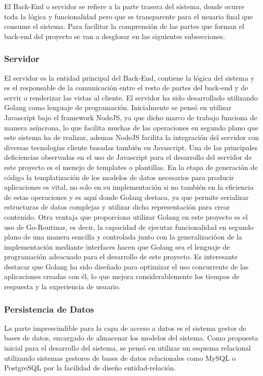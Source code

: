 \documentclass[a4paper,11pt]{book}
\begin{document}
El Back-End o servidor se refiere a la parte trasera del sistema, donde ocurre toda la lógica y funcionalidad pero que es transparente para el usuario final que consume el sistema. Para facilitar la comprensión de las partes que forman  el back-end del proyecto se van a desglosar en las siguientes subsecciones.

\subsubsection{Servidor}

El servidor es la entidad principal del Back-End, contiene la lógica del sistema y es el responsable de la comunicación entre el resto de partes del back-end y de servir o renderizar las vistas al cliente.
El servidor ha sido desarrollado utilizando Golang\cite{go} como lenguaje de programación. Inicialmente se pensó en utilizar Javascript bajo el framework NodeJS, ya que dicho marco de trabajo funciona de manera asíncrona, lo que facilita muchas de las operaciones en segundo plano que este sistema ha de realizar, ademas NodeJS facilita la integración del servidor con diversas tecnologías cliente basadas también en Javascript. Una de las principales deficiencias  observadas en el uso de Javascript para el desarrollo del servidor de este proyecto es el menejo de templates o plantillas. 
En la etapa de generación de código la templatización de los modelos de datos necesarios para producir aplicaciones es vital, no solo en su implementación si no también en la eficiencia de estas operaciones y es aquí donde Golang destaca, ya que permite serializar estructuras de datos complejas y utilizar dicha representación para crear contenido. Otra ventaja que proporciona utilizar Golang en este proyecto es el uso de Go-Routinas, es decir, la capacidad de ejecutar funcionalidad en segundo plano de una manera sencilla y controlada junto con la generalizacióon de la implementación mediante interfaces hacen que Golang sea el lenguaje de programación adeacuado para el desarrollo de este proyecto.  Es interesante destacar que Golang ha sido diseñado para optimizar el uso concurrente de las aplicaciones creadas con él, lo que mejora considerablemente los tiempos de respuesta y la experiencia de usuario. 

\subsubsection{Persistencia de Datos}

La parte imprescindible para la capa de acceso a datos es el sistema gestor de bases de datos, encargado de almacenar los modelos del sistema. Como propuesta inicial para el desarrollo del sistema, se pensó en utilizar un esquema relacional utilizando sistemas gestores de bases de datos relacionales como MySQL o PostgreSQL  por la facilidad de diseño entidad-relación. 
\end{document}

